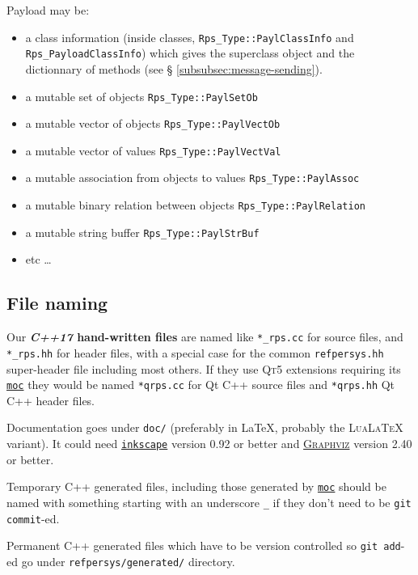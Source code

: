 \documentclass[11pt,a4paper,svgnames]{article}
\begin{document}
Payload may be:
\begin{itemize}
\item a class information (inside classes,
  \texttt{Rps\_Type::PaylClassInfo} and \texttt{Rps\_PayloadClassInfo}) which gives the superclass object
  and the dictionnary of methods (see \S
  \ref{subsubsec:message-sending}).
\item a mutable set of objects  \texttt{Rps\_Type::PaylSetOb}
\item a mutable vector of objects  \texttt{Rps\_Type::PaylVectOb}
\item a mutable vector of values  \texttt{Rps\_Type::PaylVectVal}
\item a mutable association from objects to values
  \texttt{Rps\_Type::PaylAssoc}
\item a mutable binary relation between objects
  \texttt{Rps\_Type::PaylRelation}
\item a mutable string buffer
  \texttt{Rps\_Type::PaylStrBuf}
  \item etc  \ldots
\end{itemize}

\bigskip
\subsection{File naming}
\label{subsec:file-naming}

Our \textbf{\textit{C++17} hand-written files} are named like
\texttt{*\_rps.cc} for source files, and \texttt{*\_rps.hh} for header
files, with a special case for the common \texttt{refpersys.hh}
super-header file including most others.  If they use \textsc{Qt5}
extensions requiring its
\href{https://doc.qt.io/qt-5/moc.html}{\texttt{moc}} they would be
named \texttt{*qrps.cc} for Qt C++ source files and \texttt{*qrps.hh}
Qt C++ header files.

Documentation goes under \texttt{doc/} (preferably in \LaTeX, probably
the \textsc{LuaLaTeX} variant). It could need
\href{https://inkscape.org/}{\texttt{inkscape}} version 0.92 or better and
\href{https://www.graphviz.org/}{\textsc{Graphviz}} version 2.40 or
better.

Temporary C++ generated files, including those generated by
\href{https://doc.qt.io/qt-5/moc.html}{\texttt{moc}} should be named
with something starting with an underscore \texttt{\_} if they don't
need to be \texttt{git commit}-ed.

Permanent C++ generated files which have to be version controlled so
\texttt{git add}-ed go under \texttt{refpersys/generated/} directory.
\end{document}
